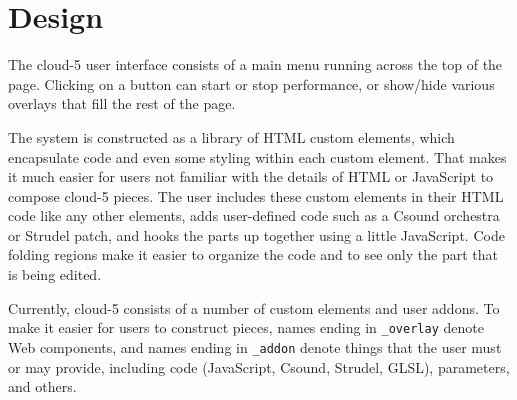 \documentclass[runningheads,a4paper]{llncs}
\begin{document}
\section{Design}

The cloud-5 user interface consists of a main menu running across the top of the page. Clicking on a button can start or stop performance, or show/hide various overlays that fill the rest of the page. 

The system is constructed as a library of HTML custom elements, which encapsulate code and even some styling within each custom element. That makes it much easier for users not familiar with the details of HTML or JavaScript to compose cloud-5 pieces. The user includes these custom elements in their HTML code like any other elements, adds user-defined code such as a Csound orchestra or Strudel patch, and hooks the parts up together using a little JavaScript. Code folding regions make it easier to organize the code and to see only the part that is being edited. 

Currently, cloud-5 consists of a number of custom elements and user addons. To make it easier for users to construct pieces, names ending in \texttt{\_overlay} denote Web components, and names ending in \texttt{\_addon} denote things that the user must or may provide, including code (JavaScript, Csound, Strudel, GLSL), parameters, and others.
\end{document}
